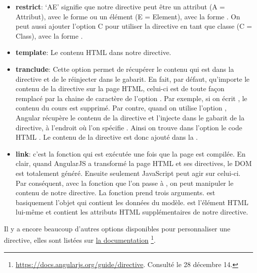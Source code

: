 \documentclass[a4paper,10pt,twoside]{sphinxmanual}
\begin{document}
\begin{itemize}
\item {} 
\textbf{restrict}: `AE' signifie que notre directive peut être un attribut (A = Attribut), avec le forme  ou un élément (E = Element), avec la forme . On peut aussi ajouter l'option C pour utiliser la directive en tant que classe (C = Class), avec la forme .

\item {} 
\textbf{template}: Le contenu HTML dans notre directive.

\item {} 
\textbf{tranclude}: Cette option permet de récupérer le contenu qui est dans la directive et de le réinjecter dans le gabarit. En fait, par défaut, qu'importe le contenu de la directive sur la page HTML, celui-ci est de toute façon remplacé par la chaine de caractère de l'option . Par exemple, si on écrit , le contenu du cours est supprimé. Par contre, quand on utilise l'option , Angular récupère le contenu de la directive et l'injecte dans le gabarit de la directive, à l'endroit où l'on spécifie . Ainsi on trouve dans l'option  le code HTML . Le contenu de la directive est donc ajouté dans la .

\item {} 
\textbf{link}: c'est la fonction qui est exécutée une fois que la page est compilée. En clair, quand AngularJS a transformé la page HTML et ses directives, le DOM est totalement généré. Ensuite seulement JavaScript peut agir sur celui-ci. Par conséquent, avec la fonction que l'on passe à , on peut manipuler le contenu de notre directive. La fonction prend trois arguments.  est basiquement l'objet qui contient les données du modèle.  est l'élément HTML lui-même et  contient les attributs HTML supplémentaires de notre directive.

\end{itemize}

Il y a encore beaucoup d'autres options disponibles pour personnaliser une directive, elles sont listées sur \href{https://docs.angularjs.org/guide/directive}{la documentation} \footnote{
\href{https://docs.angularjs.org/guide/directive}{https://docs.angularjs.org/guide/directive}. Consulté le 28 décembre 14.
}.
\end{document}
